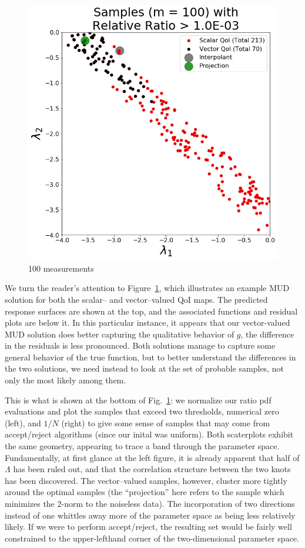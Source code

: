 \begin{figure}[htbp]
  \includegraphics[width=0.45\linewidth]{figures/pde-highd/pde-highd_update_scatter_D2_t1-0E-03}
\caption{
100 measurements
}
\label{fig:pde-highd-2d-example}
\end{figure}

We turn the reader's attention to Figure~\ref{fig:pde-highd-2d-example}, which illustrates an example MUD solution for both the scalar-- and vector--valued QoI maps.
The predicted response surfaces are shown at the top, and the associated functions and residual plots are below it.
In this particular instance, it appears that our vector-valued MUD solution does better capturing the qualitative behavior of $g$, the difference in the residuals is less pronounced.
Both solutions manage to capture some general behavior of the true function, but to better understand the differences in the two solutions, we need instead to look at the set of probable samples, not only the most likely among them.

This is what is shown at the bottom of Fig.~\ref{fig:pde-highd-2d-example}: we normalize our ratio pdf evaluations and plot the samples that exceed two thresholds, numerical zero (left), and $1/N$ (right) to give some sense of samples that may come from accept/reject algorithms (since our inital was uniform).
Both scaterplots exhibit the same geometry, appearing to trace a band through the parameter space.
Fundamentally, at first glance at the left figure, it is already apparent that half of $\Lambda$ has been ruled out, and that the correlation structure between the two knots has been discovered.
The vector--valued samples, however, cluster more tightly around the optimal samples (the ``projection'' here refers to the sample which minimizes the 2-norm to the noiseless data).
The incorporation of two directions instead of one whittles away more of the parameter space as being less relatively likely.
If we were to perform accept/reject, the resulting set would be fairly well constrained to the upper-lefthand corner of the two-dimensional parameter space.

